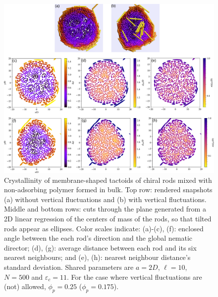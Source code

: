 \begin{figure}
\begin{center}
\includegraphics[width= \columnwidth]{figures/chapter-5/crystallinity_11}
	\caption[Crystallinity of membrane-shaped tactoids of chiral rods mixed with non-adsorbing polymer formed in bulk $\varepsilon_c=11$.]{ \label{crystal11} Crystallinity of membrane-shaped tactoids of chiral rods mixed with non-adsorbing polymer formed in bulk. Top row: rendered snapshots (a) without vertical fluctuations and (b) with vertical fluctuations. Middle and bottom rows: cuts through the plane generated from a 2D linear regression of the centers of mass of the rods, so that tilted rods appear as ellipses. Color scales indicate: (a)-(c), (f): enclosed angle between the each rod's direction and the global nematic director; (d), (g): average distance between each rod and its six nearest neighbours; and (e), (h): nearest neighbour distance's standard deviation. Shared parameters are $a = 2D$, $\ell = 10$, $N = 500$ and $\varepsilon_c=11$. For the case where vertical fluctuations are (not) allowed, $\phi_p=0.25$ ($\phi_p=0.175$).}
\end{center}
\end{figure}

